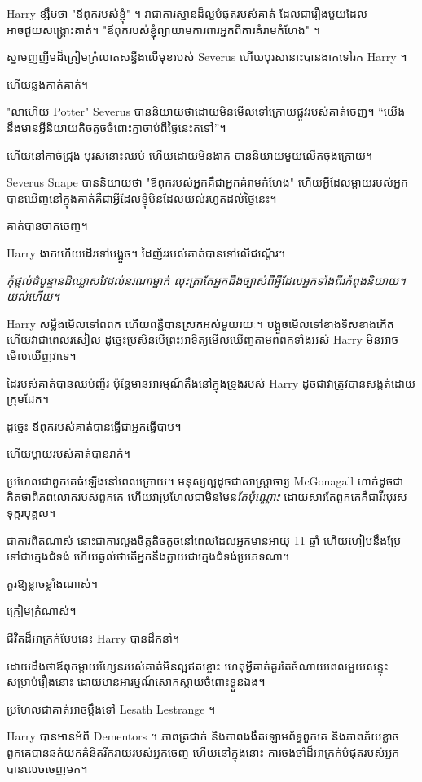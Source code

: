 {{{{{Harry ខ្សឹបថា "ឪពុករបស់ខ្ញុំ" ។ វាជាការស្មានដ៏ល្អបំផុតរបស់គាត់ ដែលជារឿងមួយដែលអាចជួយសង្រ្គោះគាត់។ "ឪពុករបស់ខ្ញុំព្យាយាមការពារអ្នកពីការគំរាមកំហែង" ។

ស្នាមញញឹមដ៏ក្រៀមក្រំលាតសន្ធឹងលើមុខរបស់ Severus ហើយបុរសនោះបានងាកទៅរក Harry ។

ហើយឆ្លងកាត់គាត់។

"លាហើយ Potter" Severus បាននិយាយថាដោយមិនមើលទៅក្រោយផ្លូវរបស់គាត់ចេញ។ “យើង​នឹង​មាន​អ្វី​និយាយ​តិច​តួច​ចំពោះ​គ្នា​ចាប់​ពី​ថ្ងៃ​នេះ​ត​ទៅ”។

ហើយនៅកាច់ជ្រុង បុរសនោះឈប់ ហើយដោយមិនងាក បាននិយាយមួយលើកចុងក្រោយ។

Severus Snape បាននិយាយថា "ឪពុករបស់អ្នកគឺជាអ្នកគំរាមកំហែង" ហើយអ្វីដែលម្តាយរបស់អ្នកបានឃើញនៅក្នុងគាត់គឺជាអ្វីដែលខ្ញុំមិនដែលយល់រហូតដល់ថ្ងៃនេះ។

គាត់បានចាកចេញ។

Harry ងាកហើយដើរទៅបង្អួច។ ដៃ​ញ័រ​របស់​គាត់​បាន​ទៅ​លើ​ជណ្ដើរ។

\emph{កុំផ្តល់ដំបូន្មានដ៏ឈ្លាសវៃដល់នរណាម្នាក់ លុះត្រាតែអ្នកដឹងច្បាស់ពីអ្វីដែលអ្នកទាំងពីរកំពុងនិយាយ។ យល់ហើយ។}

Harry សម្លឹងមើលទៅពពក ហើយពន្លឺបានស្រកអស់មួយរយៈ។ បង្អួច​មើល​ទៅ​ខាង​ទិស​ខាង​កើត ហើយ​វា​ជា​ពេល​រសៀល ដូច្នេះ​ប្រសិន​បើ​ព្រះអាទិត្យ​មើល​ឃើញ​តាម​ពពក​ទាំង​អស់ Harry មិន​អាច​មើល​ឃើញ​វា​ទេ។

ដៃរបស់គាត់បានឈប់ញ័រ ប៉ុន្តែមានអារម្មណ៍តឹងនៅក្នុងទ្រូងរបស់ Harry ដូចជាវាត្រូវបានសង្កត់ដោយក្រុមដែក។

ដូច្នេះ ឪពុក​របស់​គាត់​បាន​ធ្វើ​ជា​អ្នក​ធ្វើ​បាប។

ហើយម្តាយរបស់គាត់បានរាក់។

ប្រហែលជាពួកគេធំឡើងនៅពេលក្រោយ។ មនុស្សល្អដូចជាសាស្រ្តាចារ្យ McGonagall ហាក់ដូចជាគិតថាពិភពលោករបស់ពួកគេ ហើយវាប្រហែលជាមិនមែន\emph{តែប៉ុណ្ណោះ} ដោយសារតែពួកគេគឺជាវីរបុរសទុក្ករបុគ្គល។

ជាការពិតណាស់ នោះជាការលួងចិត្តតិចតួចនៅពេលដែលអ្នកមានអាយុ 11 ឆ្នាំ ហើយហៀបនឹងប្រែទៅជាក្មេងជំទង់ ហើយឆ្ងល់ថាតើអ្នកនឹងក្លាយជាក្មេងជំទង់ប្រភេទណា។

គួរឱ្យខ្លាចខ្លាំងណាស់។

ក្រៀមក្រំណាស់។

ជីវិតដ៏អាក្រក់បែបនេះ Harry បានដឹកនាំ។

ដោយដឹងថាឪពុកម្តាយហ្សែនរបស់គាត់មិនល្អឥតខ្ចោះ ហេតុអ្វីគាត់គួរតែចំណាយពេលមួយសន្ទុះសម្រាប់រឿងនោះ ដោយមានអារម្មណ៍សោកស្តាយចំពោះខ្លួនឯង។

ប្រហែលជាគាត់អាចប្តឹងទៅ Lesath Lestrange ។

Harry បានអានអំពី Dementors ។ ភាពត្រជាក់ និងភាពងងឹតឡោមព័ទ្ធពួកគេ និងភាពភ័យខ្លាច ពួកគេបានឆក់យកគំនិតរីករាយរបស់អ្នកចេញ ហើយនៅក្នុងនោះ ការចងចាំដ៏អាក្រក់បំផុតរបស់អ្នកបានលេចចេញមក។

}}}}}

